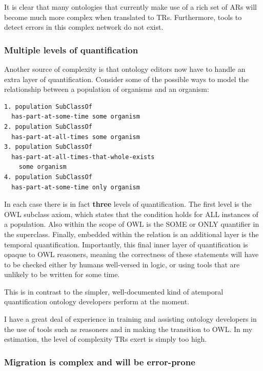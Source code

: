 \documentclass{bioinfo}
\begin{document}
It is clear that many ontologies that currently make use of a rich set
of ARs will become much more complex when translated to
TRs. Furthermore, tools to detect errors in this complex network do
not exist.

\subsubsection{Multiple levels of quantification}

Another source of complexity is that ontology editors now have to
handle an extra layer of quantification. Consider some of the possible
ways to model the relationship between a population of organisms and
an organism:

\begin{verbatim}
1. population SubClassOf 
  has-part-at-some-time some organism
2. population SubClassOf 
  has-part-at-all-times some organism
3. population SubClassOf 
  has-part-at-all-times-that-whole-exists
    some organism
4. population SubClassOf 
  has-part-at-some-time only organism
\end{verbatim}

In each case there is in fact \textbf{three} levels of
quantification. The first level is the OWL subclass axiom, which
states that the condition holds for ALL instances of a
population. Also within the scope of OWL is the SOME or ONLY
quantifier in the superclass. Finally, embedded within the relation is
an additional layer is the temporal quantification. Importantly, this
final inner layer of quantification is opaque to OWL reasoners,
meaning the correctness of these statements will have to be checked
either by humans well-versed in logic, or using tools that are
unlikely to be written for some time.

This is in contrast to the simpler, well-documented kind of atemporal
quantification ontology developers perform at the moment.


I have a great deal of experience in training and assisting ontology
developers in the use of tools such as reasoners and in making the
transition to OWL. In my estimation, the level of complexity TRs exert
is simply too high.

\subsubsection{Migration is complex and will be error-prone}
\end{document}
